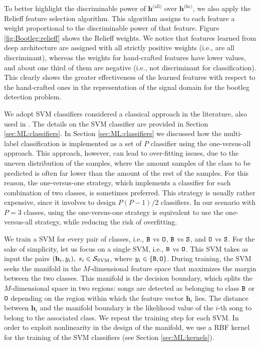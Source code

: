 To better highlight the discriminable power of $\mathbf{h}^\text{(all)}$ over  $\mathbf{h}^\text{(hc)}$, we also apply the Relieff \cite{Sikonja2003} feature selection algorithm. This algorithm assigns to each feature a weight proportional to the discriminable power of that feature. Figure \ref{fig:Bootleg:relieff} shows the Relieff weights. We notice that features learned from deep architecture are assigned with all strictly positive weights (i.e., are all discriminant), whereas the weights for hand-crafted features have lower values, and about one third of them are negative (i.e., not discriminant for classification). This clearly shows the greater effectiveness of the learned features with respect to the hand-crafted ones in the representation of the signal domain for the bootleg detection problem.

We adopt SVM classifiers considered a classical approach in the literature, also used in \cite{Bestagini2013b}. The details on the SVM classifier are provided in Section \ref{sec:ML:classifiers}. In Section \ref{sec:ML:classifiers} we discussed how the multi-label classification is implemented as a set of $P$ classifier using the one-versus-all approach. This approach, however, can lead to over-fitting issues, due to the uneven distribution of the samples, where the amount samples of the class to be predicted is often
far lower than the amount of the rest of the samples. For this reason,
the one-versus-one strategy, which implements a classifier for each combination of two classes, is sometimes preferred. This strategy is usually rather expensive, since it involves to design $P(P-1)/2$ classifiers. In our scenario with $P=3$ classes, using the one-versus-one strategy is equivalent to use the one-versus-all strategy, while reducing the risk of overfitting.

We train a SVM for every pair of classes, i.e., $\B$ vs $\O$,  $\B$ vs $\S$, and $\O$ vs $\S$. For the sake of simplicity, let us focus on a single SVM, i.e., $\B$ vs $\O$. This SVM takes as input the pairs $(\mathbf{h}_i, y_i), \; s_i \in \Ssvm$, where $y_i \in \{\B, \O\}$. During training, the SVM seeks the manifold in the $M$-dimensional feature space that maximizes the margin between the two classes. This manifold is the decision boundary, which splits the $M$-dimensional space in two regions: songs are detected as belonging to class $\B$ or $\O$ depending on the region within which the feature vector $\mathbf{h}_i$ lies. The distance between $\mathbf{h}_i$ and the manifold boundary is the likelihood value of the $i$-th song to belong to the associated class. We repeat the training step for each SVM. In order to exploit nonlinearity in the design of the manifold, we use a RBF kernel for the training of the SVM classifiers (see Section \ref{sec:ML:kernels}).

